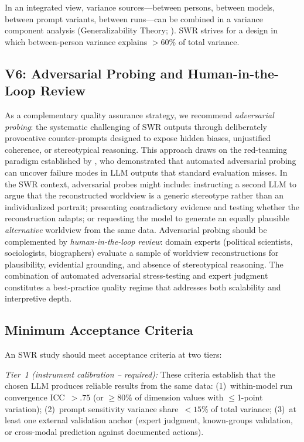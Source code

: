 \documentclass[11pt,a4paper]{article}
\theoremstyle{definition}
\theoremstyle{plain}
\theoremstyle{remark}
\begin{document}
In an integrated view, variance sources---between persons, between models, between prompt variants, between runs---can be combined in a variance component analysis (Generalizability Theory; \citealp{Brennan2001}). SWR strives for a design in which between-person variance explains $>$60\% of total variance.


\subsection{V6: Adversarial Probing and Human-in-the-Loop Review}

As a complementary quality assurance strategy, we recommend \emph{adversarial probing}: the systematic challenging of SWR outputs through deliberately provocative counter-prompts designed to expose hidden biases, unjustified coherence, or stereotypical reasoning. This approach draws on the red-teaming paradigm established by \citet{Perez2022}, who demonstrated that automated adversarial probing can uncover failure modes in LLM outputs that standard evaluation misses. In the SWR context, adversarial probes might include: instructing a second LLM to argue that the reconstructed worldview is a generic stereotype rather than an individualized portrait; presenting contradictory evidence and testing whether the reconstruction adapts; or requesting the model to generate an equally plausible \emph{alternative} worldview from the same data. Adversarial probing should be complemented by \emph{human-in-the-loop review}: domain experts (political scientists, sociologists, biographers) evaluate a sample of worldview reconstructions for plausibility, evidential grounding, and absence of stereotypical reasoning. The combination of automated adversarial stress-testing and expert judgment constitutes a best-practice quality regime that addresses both scalability and interpretive depth.

\subsection{Minimum Acceptance Criteria}
\label{sec:acceptance}

An SWR study should meet acceptance criteria at two tiers:

\emph{Tier~1 (instrument calibration -- required):} These criteria establish that the chosen LLM produces reliable results from the same data: (1)~within-model run convergence ICC~$> .75$ (or $\geq 80\%$ of dimension values with $\leq$1-point variation); (2)~prompt sensitivity variance share~$< 15\%$ of total variance; (3)~at least one external validation anchor (expert judgment, known-groups validation, or cross-modal prediction against documented actions).
\end{document}
